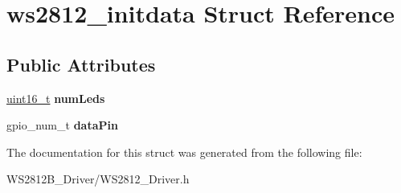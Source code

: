 \hypertarget{structws2812__initdata}{}\section{ws2812\+\_\+initdata Struct Reference}
\label{structws2812__initdata}
\subsection*{Public Attributes}
\begin{DoxyCompactItemize}
\item 
\mbox{\label{structws2812__initdata_ae5b6a7331ddd2d8b8421c69cb8352482}} 
\hyperlink{vl53l0x__types_8h_a273cf69d639a59973b6019625df33e30}{uint16\+\_\+t} {\bfseries num\+Leds}
\item 
\mbox{\label{structws2812__initdata_a3cefe263904dd7132bc2fbf1eea90be5}} 
gpio\+\_\+num\+\_\+t {\bfseries data\+Pin}
\end{DoxyCompactItemize}


The documentation for this struct was generated from the following file\+:\begin{DoxyCompactItemize}
\item 
W\+S2812\+B\+\_\+\+Driver/W\+S2812\+\_\+\+Driver.\+h\end{DoxyCompactItemize}
